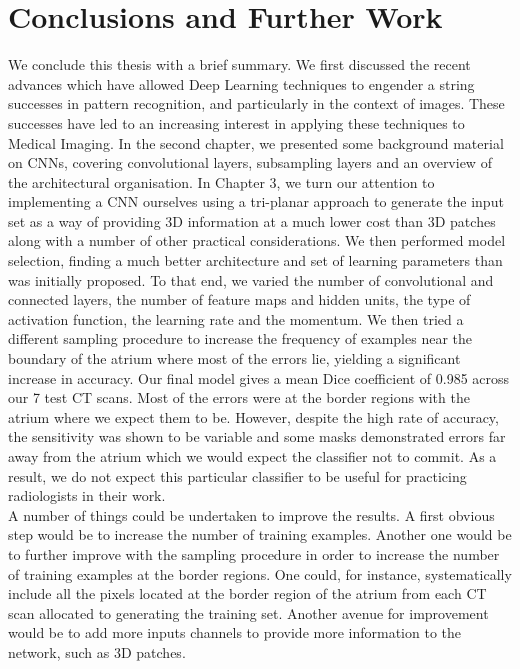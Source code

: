 \chapter{Conclusions and Further Work}

\noindent We conclude this thesis with a brief summary. We first discussed the recent advances which have allowed Deep Learning techniques to engender a string successes in pattern recognition, and particularly in the context of images. These successes have led to an increasing interest in applying these techniques to Medical Imaging. In the second chapter, we presented some background material on CNNs, covering convolutional layers, subsampling layers and an overview of the architectural organisation. In Chapter 3, we turn our attention to implementing a CNN ourselves using a tri-planar approach to generate the input set as a way of providing 3D information at a much lower cost than 3D patches along with a number of other practical considerations. We then performed model selection, finding a much better architecture and set of learning parameters than was initially proposed. To that end, we varied the number of convolutional and connected layers, the number of feature maps and hidden units, the type of activation function, the learning rate and the momentum. We then tried a different sampling procedure to increase the frequency of examples near the boundary of the atrium where most of the errors lie, yielding a significant increase in accuracy. Our final model gives a mean Dice coefficient of 0.985 across our 7 test CT scans. Most of the errors were at the border regions with the atrium where we expect them to be. However, despite the high rate of accuracy, the sensitivity was shown to be variable and some masks demonstrated errors far away from the atrium which we would expect the classifier not to commit. As a result, we do not expect this particular classifier to be useful for practicing radiologists in their work.\\

\noindent A number of things could be undertaken to improve the results. A first obvious step would be to increase the number of training examples. Another one would be to further improve with the sampling procedure in order to increase the number of training examples at the border regions. One could, for instance, systematically include all the pixels located at the border region of the atrium from each CT scan allocated to generating the training set. Another avenue for improvement would be to add more inputs channels to provide more information to the network, such as 3D patches.